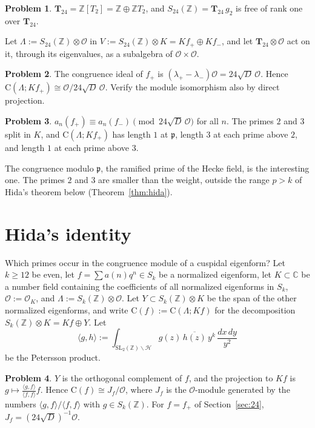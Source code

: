 \documentclass[reqno]{amsart}
\theoremstyle{definition}
\newtheorem{problem}{Problem}[section]
\theoremstyle{plain}
\newcommand{\Z}{\mathbb{Z}}
\newcommand{\C}{\mathbb{C}}
\newcommand{\Oc}{\mathcal{O}}
\newcommand{\T}{\mathbf{T}}
\newcommand{\pp}{\mathfrak{p}}
\newcommand{\Cg}{\mathrm{C}}
\begin{document}
\begin{problem}\label{pr:T24}
\(\T_{24} = \Z[T_2] = \Z \oplus \Z T_2\), and \(S_{24}(\Z) = \T_{24}\, g_2\) is free of rank one over \(\T_{24}\).
\end{problem}

Let \(\Lambda := S_{24}(\Z) \otimes \Oc\) in \(V := S_{24}(\Z) \otimes K = K f_+ \oplus K f_-\), and let \(\T_{24} \otimes \Oc\) act on it, through its eigenvalues, as a subalgebra of \(\Oc \times \Oc\).

\begin{problem}\label{pr:cong24}
The congruence ideal of \(f_+\) is \((\lambda_+ - \lambda_-)\Oc = 24\sqrt D\,\Oc\).  Hence \(\Cg(\Lambda; K f_+) \cong \Oc/24\sqrt D\,\Oc\).  Verify the module isomorphism also by direct projection.
\end{problem}

\begin{problem}\label{pr:modp}
\(a_n(f_+) \equiv a_n(f_-) \pmod{24\sqrt D\,\Oc}\) for all \(n\).  The primes \(2\) and \(3\) split in \(K\), and \(\Cg(\Lambda; K f_+)\) has length \(1\) at \(\pp\), length \(3\) at each prime above \(2\), and length \(1\) at each prime above \(3\).
\end{problem}

The congruence modulo \(\pp\), the ramified prime of the Hecke field, is the interesting one.  The primes \(2\) and \(3\) are smaller than the weight, outside the range \(p > k\) of Hida's theorem below (Theorem~\ref{thm:hida}).

\section{Hida's identity}\label{sec:hida}

Which primes occur in the congruence module of a cuspidal eigenform?  Let \(k \ge 12\) be even, let \(f = \sum a(n) q^n \in S_k\) be a normalized eigenform, let \(K \subset \C\) be a number field containing the coefficients of all normalized eigenforms in \(S_k\), \(\Oc := \Oc_K\), and \(\Lambda := S_k(\Z) \otimes \Oc\).  Let \(Y \subset S_k(\Z) \otimes K\) be the span of the other normalized eigenforms, and write \(\Cg(f) := \Cg(\Lambda; K f)\) for the decomposition \(S_k(\Z) \otimes K = K f \oplus Y\).  Let
\[
  \langle g, h \rangle := \int_{\mathrm{SL}_2(\Z)\backslash \mathcal H} g(z)\,\overline{h(z)}\, y^{k} \,\frac{dx\,dy}{y^2}
\]
be the Petersson product.

\begin{problem}\label{pr:orth}
\(Y\) is the orthogonal complement of \(f\), and the projection to \(K f\) is \(g \mapsto \frac{\langle g, f \rangle}{\langle f, f \rangle} f\).  Hence \(\Cg(f) \cong J_f/\Oc\), where \(J_f\) is the \(\Oc\)-module generated by the numbers \(\langle g, f \rangle / \langle f, f \rangle\) with \(g \in S_k(\Z)\).  For \(f = f_+\) of Section~\ref{sec:24}, \(J_f = (24\sqrt D)^{-1}\Oc\).
\end{problem}
\end{document}
